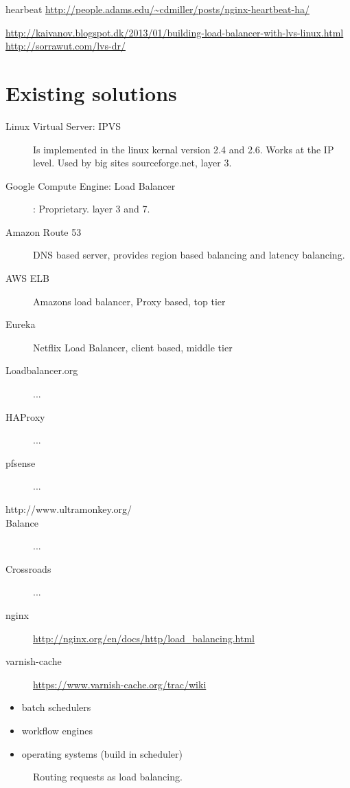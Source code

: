 hearbeat 	\url{http://people.adams.edu/~cdmiller/posts/nginx-heartbeat-ha/}

\url{http://kaivanov.blogspot.dk/2013/01/building-load-balancer-with-lvs-linux.html}
\url{http://sorrawut.com/lvs-dr/}
\section{Existing solutions}
\begin{description}
	\item [Linux Virtual Server: IPVS] Is implemented in the linux kernal version 2.4 and 2.6. Works at the IP level. Used by big sites sourceforge.net, layer 3.
	\item [Google Compute Engine: Load Balancer]: Proprietary. layer 3 and 7.
	\item [Amazon Route 53] DNS based server, provides region based balancing and latency balancing.
	\item [AWS ELB] Amazons load balancer, Proxy based, top tier
	\item [Eureka] Netflix Load Balancer, client based, middle tier

	\item [Loadbalancer.org] ...
	\item [HAProxy] ...
	\item [pfsense] ...
	\item [http://www.ultramonkey.org/]
	\item [Balance] ...
	\item [Crossroads] ...
	\item [nginx] \url{http://nginx.org/en/docs/http/load_balancing.html}
	\item [varnish-cache] \url{https://www.varnish-cache.org/trac/wiki}
\end{description}

\begin{itemize}
	\item batch schedulers
	\item workflow engines
	\item operating systems (build in scheduler)
\end{itemize}

\begin{figure}
	\centering	
	\scalebox{0.7}{}
	\caption[Routing requests as load balancing]{
		\label{fig:RoutingloadBalancingSetup} 
		\footnotesize{%
			Routing requests as load balancing.
		}
	}
\end{figure}

